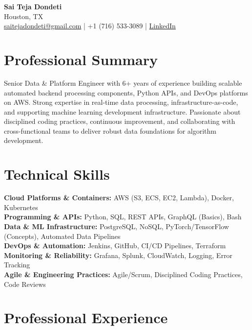 \documentclass[10pt]{article}
\begin{document}
\begin{center}
    {\LARGE \textbf{Sai Teja Dondeti}} \\
    \vspace{2pt}
    Houston, TX \\
    \href{mailto:saitejadondeti@gmail.com}{saitejadondeti@gmail.com} \;|\;
    +1 (716) 533-3089 \;|\;
    \href{https://www.linkedin.com/in/sai-teja-dondeti/}{LinkedIn}
\end{center}

\section*{Professional Summary}
Senior Data & Platform Engineer with 6+ years of experience building scalable automated backend processing components, Python APIs, and DevOps platforms on AWS. Strong expertise in real-time data processing, infrastructure-as-code, and supporting machine learning development infrastructure. Passionate about disciplined coding practices, continuous improvement, and collaborating with cross-functional teams to deliver robust data foundations for algorithm development.

\section*{Technical Skills}

\textbf{Cloud Platforms \& Containers:} AWS (S3, ECS, EC2, Lambda), Docker, Kubernetes \\
\textbf{Programming \& APIs:} Python, SQL, REST APIs, GraphQL (Basics), Bash \\
\textbf{Data \& ML Infrastructure:} PostgreSQL, NoSQL, PyTorch/TensorFlow (Concepts), Automated Data Pipelines \\
\textbf{DevOps \& Automation:} Jenkins, GitHub, CI/CD Pipelines, Terraform \\
\textbf{Monitoring \& Reliability:} Grafana, Splunk, CloudWatch, Logging, Error Tracking \\
\textbf{Agile \& Engineering Practices:} Agile/Scrum, Disciplined Coding Practices, Code Reviews

\section*{Professional Experience}
\end{document}
